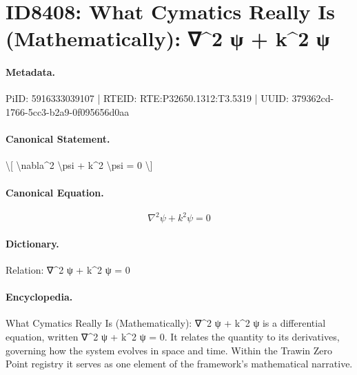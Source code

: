\section*{ID8408: What Cymatics Really Is (Mathematically): ∇\textasciicircum{}2 ψ + k\textasciicircum{}2 ψ}
\paragraph{Metadata.}
PiID: 5916333039107 | RTEID: RTE:P32650.1312:T3.5319 | UUID: 379362cd-1766-5cc3-b2a9-0f095656d0aa

\paragraph{Canonical Statement.}
\textbackslash{}[ \textbackslash{}nabla\textasciicircum{}2 \textbackslash{}psi + k\textasciicircum{}2 \textbackslash{}psi = 0 \textbackslash{}]

\paragraph{Canonical Equation.}
\[
\nabla^2 \psi + k^2 \psi = 0
\]

\paragraph{Dictionary.}
Relation: ∇\textasciicircum{}2 ψ + k\textasciicircum{}2 ψ = 0

\paragraph{Encyclopedia.}
What Cymatics Really Is (Mathematically): ∇\textasciicircum{}2 ψ + k\textasciicircum{}2 ψ is a differential equation, written ∇\textasciicircum{}2 ψ + k\textasciicircum{}2 ψ = 0. It relates the quantity to its derivatives, governing how the system evolves in space and time. Within the Trawin Zero Point registry it serves as one element of the framework's mathematical narrative.
